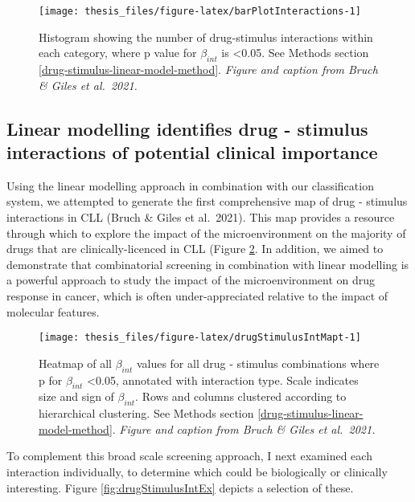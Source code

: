 \documentclass[11pt, a4paper, twosided]{book}
\begin{document}
\begin{figure}

{\centering \texttt{[image: thesis\_files/figure-latex/barPlotInteractions-1]} 

}

\caption{Histogram showing the number of drug-stimulus interactions within each category, where p value for \(\beta_{int}\) is \textless0.05. See Methods section \ref{drug-stimulus-linear-model-method}. \emph{Figure and caption from Bruch \& Giles et al.~2021.}}\label{fig:barPlotInteractions}
\end{figure}
\hypertarget{drug-stimulus-interaction-examples}{%
\subsection{Linear modelling identifies drug - stimulus interactions of potential clinical importance}\label{drug-stimulus-interaction-examples}}

Using the linear modelling approach in combination with our classification system, we attempted to generate the first comprehensive map of drug - stimulus interactions in CLL (Bruch \& Giles et al.~2021). This map provides a resource through which to explore the impact of the microenvironment on the majority of drugs that are clinically-licenced in CLL (Figure \ref{fig:drugStimulusIntMapt}. In addition, we aimed to demonstrate that combinatorial screening in combination with linear modelling is a powerful approach to study the impact of the microenvironment on drug response in cancer, which is often under-appreciated relative to the impact of molecular features.


\begin{figure}

{\centering \texttt{[image: thesis\_files/figure-latex/drugStimulusIntMapt-1]} 

}

\caption{Heatmap of all \(\beta_{int}\) values for all drug - stimulus combinations where p for \(\beta_{int}\) \textless0.05, annotated with interaction type. Scale indicates size and sign of \(\beta_{int}\). Rows and columns clustered according to hierarchical clustering. See Methods section \ref{drug-stimulus-linear-model-method}. \emph{Figure and caption from Bruch \& Giles et al.~2021.}}\label{fig:drugStimulusIntMapt}
\end{figure}
To complement this broad scale screening approach, I next examined each interaction individually, to determine which could be biologically or clinically interesting. Figure \ref{fig:drugStimulusIntEx} depicts a selection of these.
\end{document}
